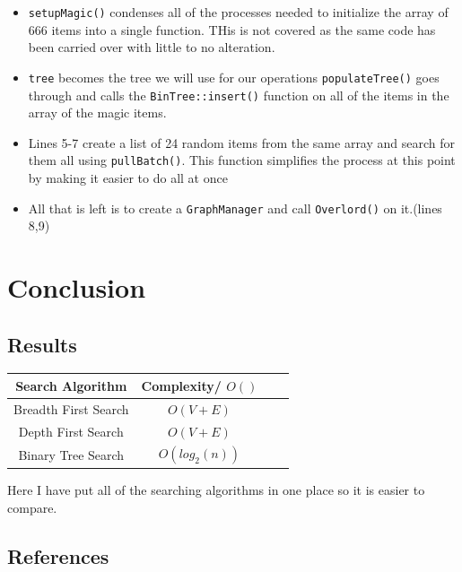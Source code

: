 \documentclass[letterpaper, 10pt]{article}
\begin{document}
\begin{itemize}
    \item \texttt{setupMagic()} condenses all of the processes needed to initialize the array of 666 items into a single function. THis is not covered as the same code has been carried over with little to no alteration.
    \item \texttt{tree} becomes the tree we will use for our operations
    \texttt{populateTree()} goes through and calls the \texttt{BinTree::insert()} function on all of the items in the array of the magic items.
    \item Lines 5-7 create a list of 24 random items from the same array and search for them all using \texttt{pullBatch()}. This function simplifies the process at this point by making it easier to do all at once
    \item All that is left is to create a \texttt{GraphManager} and call \texttt{Overlord()} on it.(lines 8,9)
    
\end{itemize}






\section{Conclusion}
\subsection{Results}
\begin{center}
{
 \begin{tabular}{||c c c c||} 
 \hline
 Search Algorithm & Complexity/ $O()$\\ [0.5ex] 
 \hline\hline
  Breadth First Search & $O(V+E)$\\
   \hline
 Depth First Search & $O(V+E)$\\ 
 \hline
 Binary Tree Search&$O(log_2(n))$\\



 \hline
\end{tabular}
}
\end{center}

Here I have put all of the searching algorithms in one place so it is easier to compare.

\subsection{References}
\end{document}
